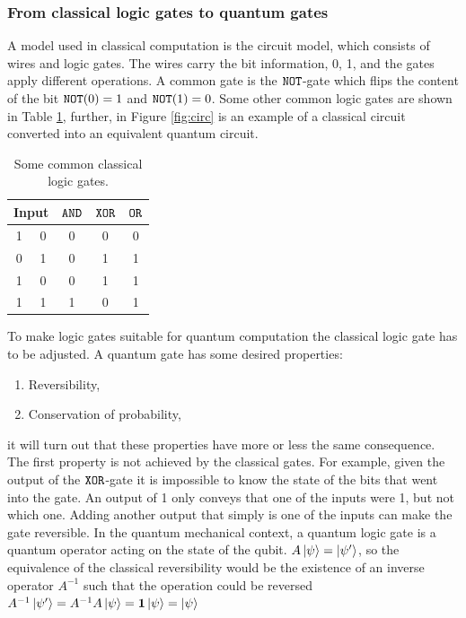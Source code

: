 \subsubsection{From classical logic gates to quantum gates}
A model used in classical computation is the circuit model, which consists of wires and logic gates. The wires carry the bit information, 0, 1, and the gates apply different operations. A common gate is the ${\tt NOT}$-gate which flips the content of the bit ${\tt NOT}(0) = 1$ and ${\tt NOT}(1) = 0$. Some other common logic gates are shown in Table \ref{tab:gates}, further, in Figure \ref{fig:circ} is an example of a classical circuit converted into an equivalent quantum circuit.  

\begin{table}[h]
    \centering
    \begin{tabular}{|c|c|c|c|c|}
    \hline
    \multicolumn{2}{|c|}{Input} & ${\tt AND}$ & ${\tt XOR}$ & ${\tt OR}$\\
    \hline
    1 & 0 & 0& 0& 0\\
    0 & 1 & 0& 1& 1\\
    1 & 0 & 0& 1& 1\\
    1 & 1 & 1& 0& 1\\
    \hline
    \end{tabular}
    \caption{Some common classical logic gates.}
    \label{tab:gates}
\end{table}


To make logic gates suitable for quantum computation the classical logic gate has to be adjusted. A quantum gate has some desired properties:
\begin{enumerate}
\item Reversibility,
\item Conservation of probability,
\end{enumerate}
it will turn out that these properties have more or less the same consequence. The first property is not achieved by the classical gates. For example, given the output of the ${\tt XOR}$-gate  it is impossible to know the state of the bits that went into the gate. An output of 1 only conveys that one of the inputs were 1, but not which one. Adding another output that simply is one of the inputs can make the gate reversible. In the quantum mechanical context, a quantum logic gate is a quantum operator acting on the state of the qubit. $A\ket{\psi} = \ket{\psi'}$, so the equivalence of the classical reversibility would be the existence of an inverse operator $A^{-1}$ such that the operation could be reversed $A^{-1}\ket{\psi'} = A^{-1}A\ket{\psi} = \mathbf{1}\ket{\psi} = \ket{\psi}$

